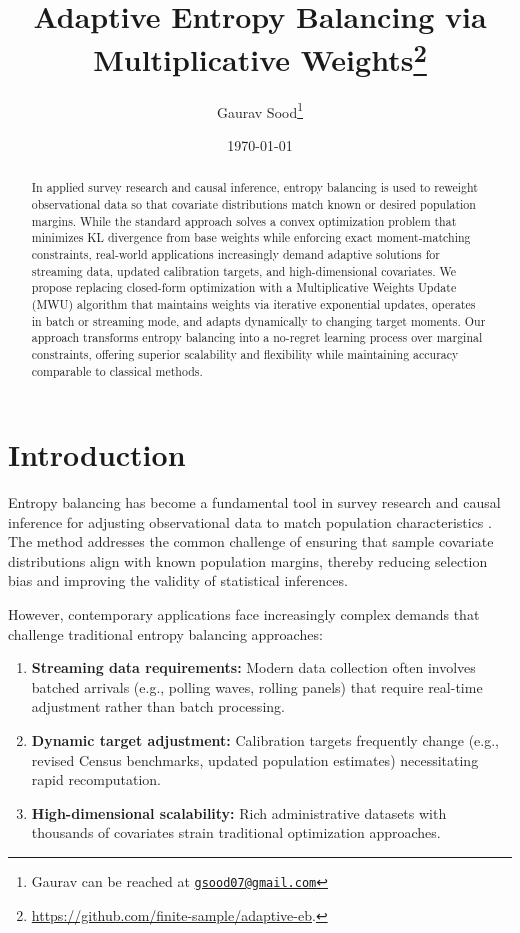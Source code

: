 \documentclass[12pt, letterpaper]{article}
\title{Adaptive Entropy Balancing via Multiplicative Weights\thanks{\href{https://github.com/finite-sample/adaptive-eb}{https://github.com/finite-sample/adaptive-eb}.}}
\author{Gaurav Sood\thanks{Gaurav can be reached at \href{mailto:gsood07@gmail.com}{\footnotesize{\texttt{gsood07@gmail.com}}}}\vspace{.5cm}}
\date{\today}
\begin{document}
\maketitle

\begin{abstract}
In applied survey research and causal inference, entropy balancing is used to reweight observational data so that covariate distributions match known or desired population margins. While the standard approach solves a convex optimization problem that minimizes KL divergence from base weights while enforcing exact moment-matching constraints, real-world applications increasingly demand adaptive solutions for streaming data, updated calibration targets, and high-dimensional covariates. We propose replacing closed-form optimization with a Multiplicative Weights Update (MWU) algorithm that maintains weights via iterative exponential updates, operates in batch or streaming mode, and adapts dynamically to changing target moments. Our approach transforms entropy balancing into a no-regret learning process over marginal constraints, offering superior scalability and flexibility while maintaining accuracy comparable to classical methods.
\end{abstract}

\section{Introduction}

Entropy balancing has become a fundamental tool in survey research and causal inference for adjusting observational data to match population characteristics \citep{hainmueller2012entropy}. The method addresses the common challenge of ensuring that sample covariate distributions align with known population margins, thereby reducing selection bias and improving the validity of statistical inferences.

However, contemporary applications face increasingly complex demands that challenge traditional entropy balancing approaches:

\begin{enumerate}
\item \textbf{Streaming data requirements:} Modern data collection often involves batched arrivals (e.g., polling waves, rolling panels) that require real-time adjustment rather than batch processing.
\item \textbf{Dynamic target adjustment:} Calibration targets frequently change (e.g., revised Census benchmarks, updated population estimates) necessitating rapid recomputation.
\item \textbf{High-dimensional scalability:} Rich administrative datasets with thousands of covariates strain traditional optimization approaches.
\end{enumerate}
\end{document}
